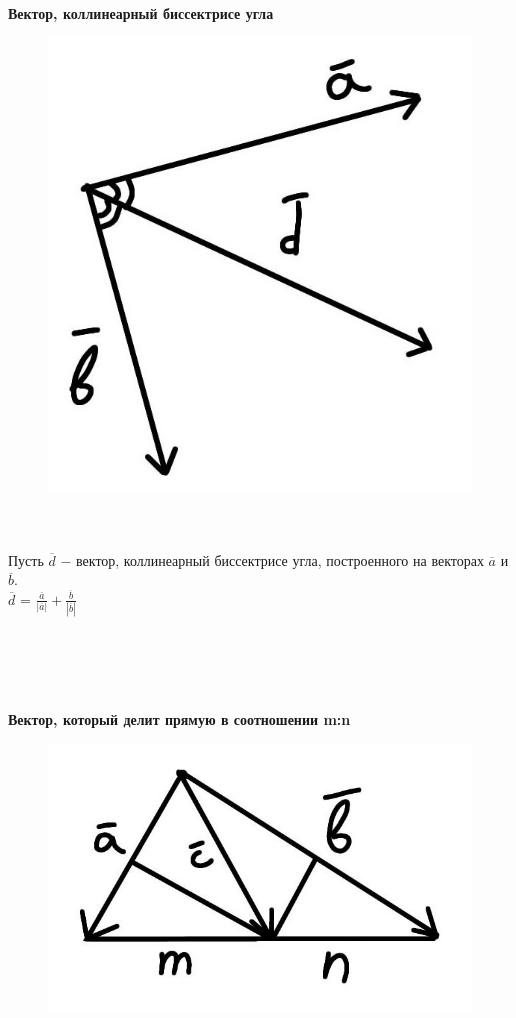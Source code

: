 \textbf{Вектор, коллинеарный биссектрисе угла}

\begin{figure}
	\includegraphics[width=0.6\linewidth]{images/биссектриса.jpeg}
\end{figure}

\tab\\ \tab\\

Пусть $\overline{d}$ $-$ вектор, коллинеарный биссектрисе угла, построенного на векторах $\overline{a}$ и $\overline{b}$.\\
 
$\overline{d}$ = $\frac{\overline{a}}{|\overline{a}|} + \frac{\overline{b}}{|\overline{b}|}$

\tab\\ \tab\\ \tab\\ \tab\\
\textbf{Вектор, который делит прямую в соотношении m:n}

\begin{figure}
	\includegraphics[width=0.6\linewidth]{images/соотношение.jpeg}
\end{figure}

